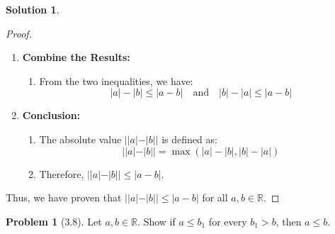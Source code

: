 \documentclass[12pt]{article}
\theoremstyle{definition} %
\newtheorem{solution}{Solution}
\newtheorem{problem}{Problem}
\theoremstyle{plain} %
\begin{document}
\begin{solution}
\begin{enumerate}
\begin{proof}
\begin{enumerate}
            \item \textbf{Combine the Results:}
            \begin{enumerate}
                \item From the two inequalities, we have:
                $$
                |a| - |b| \leq |a - b| \quad \text{and} \quad |b| - |a| \leq |a - b|
                $$
            \end{enumerate}
            
            \item \textbf{Conclusion:}
            \begin{enumerate}
                \item The absolute value $||a| - |b||$ is defined as:
                $$
                ||a| - |b|| = \max(|a| - |b|, |b| - |a|)
                $$
                \item Therefore, $||a| - |b|| \leq |a - b|$.
            \end{enumerate}
        \end{enumerate}
        
        Thus, we have proven that $||a|-|b||\leq|a-b|$ for all $a,b \in \mathbb{R}$. 
        
    \end{proof}
   \end{enumerate} 
\end{solution}







\begin{problem}[3.8]
 Let $a,b \in \mathbb{R}$. Show if $a\leq b_{1}$ for every $b_{1} > b$, then $a\leq b$.
   
\end{problem}
\end{document}
